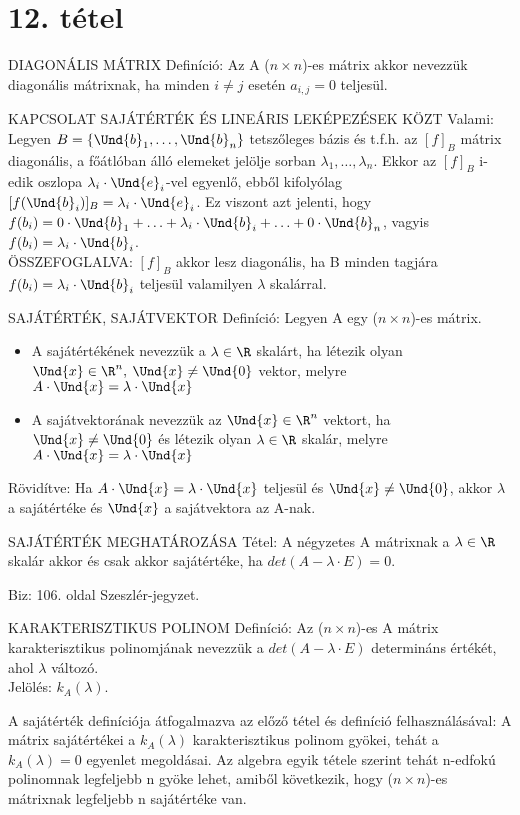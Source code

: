 \section{12. tétel}

\begin{shaded}
DIAGONÁLIS MÁTRIX Definíció: Az A ($n \times n$)-es mátrix akkor nevezzük diagonális mátrixnak, ha minden $i \neq j$ esetén $a_{i,j} = 0$ teljesül.
\end{shaded}
\begin{framed}
KAPCSOLAT SAJÁTÉRTÉK ÉS LINEÁRIS LEKÉPEZÉSEK KÖZT Valami:
Legyen $B = \{\Und{b}_1, \ldots, \Und{b}_n\}$ tetszőleges bázis és t.f.h. az $[f]_B$ mátrix diagonális, a főátlóban álló elemeket jelölje sorban $\lambda_1, \ldots, \lambda_n$. Ekkor az $[f]_B$ i-edik oszlopa $\lambda_i\cdot\Und{e}_i$-vel egyenlő, ebből kifolyólag $[f(\Und{b}_i)]_B = \lambda_i \cdot \Und{e}_i$. Ez viszont azt jelenti, hogy $f(b_i) = 0\cdot\Und{b}_1 + \ldots + \lambda_i \cdot \Und{b}_i + \ldots + 0 \cdot\Und{b}_n$, vagyis $f(b_i) = \lambda_i \cdot \Und{b}_i$.\\
ÖSSZEFOGLALVA: $[f]_B$ akkor lesz diagonális, ha B minden tagjára $f(b_i) = \lambda_i \cdot \Und{b}_i$ teljesül valamilyen $\lambda$ skalárral.
\end{framed}
\begin{shaded}
SAJÁTÉRTÉK, SAJÁTVEKTOR Definíció: Legyen A egy ($n \times n$)-es mátrix.
\begin{itemize}
\item A sajátértékének nevezzük a $\lambda \in \R$ skalárt, ha létezik olyan $\Und{x} \in \R^n,\: \Und{x} \neq \Und{0}$ vektor, melyre $A \cdot \Und{x} = \lambda\cdot \Und{x}$
\item A sajátvektorának nevezzük az $\Und{x} \in \R^n$ vektort, ha $\Und{x} \neq \Und{0}$ és létezik olyan $\lambda \in \R$ skalár, melyre $A \cdot \Und{x} = \lambda\cdot \Und{x}$
\end{itemize}
Rövidítve: Ha $A\cdot\Und{x} = \lambda\cdot\Und{x}$ teljesül és $\Und{x} \neq \Und{0}$, akkor $\lambda$ a sajátértéke és $\Und{x}$ a sajátvektora az A-nak.
\end{shaded}
\begin{framed}
SAJÁTÉRTÉK MEGHATÁROZÁSA Tétel: A négyzetes A mátrixnak a $\lambda \in \R$ skalár akkor és csak akkor sajátértéke, ha $det(A - \lambda\cdot E) = 0$.
\end{framed}
\begin{leftbar}
Biz: 106. oldal Szeszlér-jegyzet.
\end{leftbar}
\begin{shaded}
KARAKTERISZTIKUS POLINOM Definíció: Az ($n \times n$)-es A mátrix karakterisztikus polinomjának nevezzük a $det(A - \lambda\cdot E)$ determináns értékét, ahol $\lambda$ változó.\\
Jelölés: $k_A(\lambda)$.
\end{shaded}
A sajátérték definíciója átfogalmazva az előző tétel és definíció felhasználásával: A mátrix sajátértékei a $k_A(\lambda)$ karakterisztikus polinom gyökei, tehát a $k_A(\lambda) = 0$ egyenlet megoldásai. Az algebra egyik tétele szerint tehát n-edfokú polinomnak legfeljebb n gyöke lehet, amiből következik, hogy ($n \times n$)-es mátrixnak legfeljebb n sajátértéke van.
